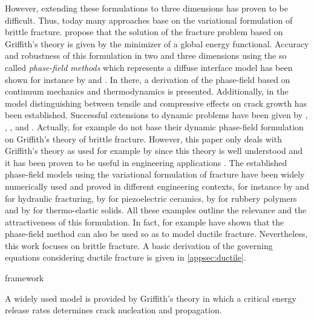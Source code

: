 However, extending these formulations to three dimensions has proven to be difficult. Thus, today many approaches base on the variational formulation of brittle fracture. \citet{02_B_VarBrittle} propose that the solution of the fracture problem based on Griffith's theory is given by the minimizer of a global energy functional. Accuracy and robustness of this formulation in two and three dimensions using the so called \textit{phase-field methods} which represents a diffuse interface model has been shown for instance by \citet{04_B_VarBrittleProve2} and \citet{03_B_VarBrittleProve1}. In there, a derivation of the phase-field based on continuum mechanics and thermodynamics is presented. Additionally, in \cite{04_B_VarBrittleProve2} the model distinguishing between tensile and compressive effects on crack growth has been established. Successful extensions to dynamic problems have been given by \citet{01_PF_dyn_brittle}, \citet{05_B_dynExtension1}, \citet{06_B_dynExtension2}, \citet{07_B_dynExtension3} and \citet{08_B_dynExtension4}. Actually, for example \citet{10_PH_Mode3} do not base their dynamic phase-field formulation on Griffith's theory of brittle fracture. However, this paper only deals with Griffith's theory as used for example by \citet{08_PF_Gammac2} since this theory is well understood and it has been proven to be useful in engineering applications \citep{01_PF_dyn_brittle}. The established phase-field models using the variational formulation of fracture have been widely numerically used and proved in different engineering contexts, for instance by \citet{11_B_EngProb1} and \citet{12_B_EngProb2} for hydraulic fracturing, by \citet{13_B_EngProb3} for piezoelectric ceramics, by \citet{14_B_EngProb4} for rubbery polymers and by \citet{15_B_EngProb5} for thermo-elastic solids. All these examples outline the relevance and the attractiveness of this formulation. In fact, for example \citet{03_PF_ductile} have shown that the phase-field method can also be used so as to model ductile fracture. Nevertheless, this work focuses on brittle fracture. A basic derivation of the governing equations considering ductile fracture is given in \ref{appsec:ductile}.

framework \citet{09_B_IGA1}





A widely used model is provided by  Griffith's theory in which a critical energy release rates determines crack nucleation and propagation.



